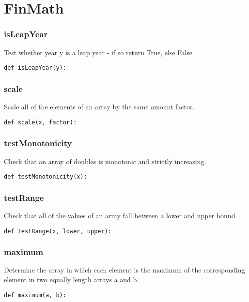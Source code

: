 \documentclass[twoside,11pt]{book}
\begin{document}
\newpage
\section{FinMath}

\subsubsection*{{\bf isLeapYear}}
Test whether year y is a leap year - if so return True, else False  

\begin{lstlisting}
def isLeapYear(y):
\end{lstlisting}

\subsubsection*{{\bf scale}}
Scale all of the elements of an array by the same amount factor.  

\begin{lstlisting}
def scale(x, factor):
\end{lstlisting}

\subsubsection*{{\bf testMonotonicity}}
Check that an array of doubles is monotonic and strictly increasing.  

\begin{lstlisting}
def testMonotonicity(x):
\end{lstlisting}

\subsubsection*{{\bf testRange}}
Check that all of the values of an array fall between a lower and upper bound.  

\begin{lstlisting}
def testRange(x, lower, upper):
\end{lstlisting}

\subsubsection*{{\bf maximum}}
Determine the array in which each element is the maximum of the corresponding element in two equally length arrays a and b.  

\begin{lstlisting}
def maximum(a, b):
\end{lstlisting}
\end{document}
